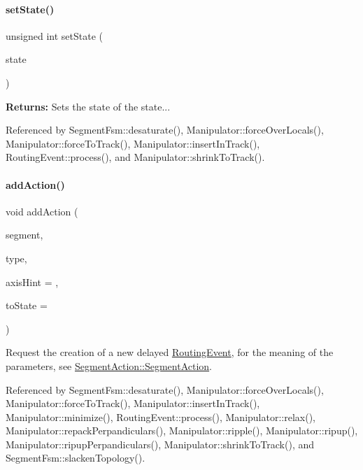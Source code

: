 \paragraph{\texorpdfstring{set\+State()}{setState()}}
{\footnotesize\ttfamily unsigned int set\+State (\begin{DoxyParamCaption}\item[{unsigned int}]{state }\end{DoxyParamCaption})\hspace{0.3cm}{\ttfamily [inline]}}

{\bfseries Returns\+:} Sets the state of the state... 

Referenced by Segment\+Fsm\+::desaturate(), Manipulator\+::force\+Over\+Locals(), Manipulator\+::force\+To\+Track(), Manipulator\+::insert\+In\+Track(), Routing\+Event\+::process(), and Manipulator\+::shrink\+To\+Track().

\mbox{\label{classKite_1_1SegmentFsm_ad9384c1cc2a9cd70ab9ff089b56380a0}} 
\paragraph{\texorpdfstring{add\+Action()}{addAction()}}
{\footnotesize\ttfamily void add\+Action (\begin{DoxyParamCaption}\item[{\hyperlink{classKite_1_1TrackElement}{Track\+Element} $\ast$}]{segment,  }\item[{unsigned int}]{type,  }\item[{\textbf{ Db\+U\+::\+Unit}}]{axis\+Hint = {},  }\item[{unsigned int}]{to\+State = {} }\end{DoxyParamCaption})}

Request the creation of a new delayed \hyperlink{classKite_1_1RoutingEvent}{Routing\+Event}, for the meaning of the parameters, see \hyperlink{classKite_1_1SegmentAction_acbeca58f8327b69a540628f299d5bd35}{Segment\+Action\+::\+Segment\+Action}. 

Referenced by Segment\+Fsm\+::desaturate(), Manipulator\+::force\+Over\+Locals(), Manipulator\+::force\+To\+Track(), Manipulator\+::insert\+In\+Track(), Manipulator\+::minimize(), Routing\+Event\+::process(), Manipulator\+::relax(), Manipulator\+::repack\+Perpandiculars(), Manipulator\+::ripple(), Manipulator\+::ripup(), Manipulator\+::ripup\+Perpandiculars(), Manipulator\+::shrink\+To\+Track(), and Segment\+Fsm\+::slacken\+Topology().

